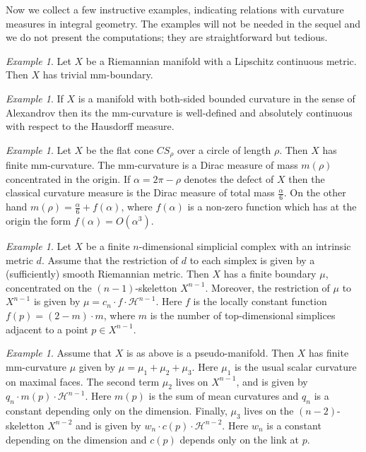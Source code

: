 \documentclass[12pt,leqno]{amsart}
\numberwithin{equation}{section}
\theoremstyle{definition}
\theoremstyle{remark}
\newtheorem{ex}[thm]{Example}
\begin{document}
Now we collect a few instructive examples, indicating relations with curvature measures in integral geometry.  The examples  will not be needed in the sequel and we do not present the computations;
they are straightforward but tedious.

\begin{ex}
Let $X$ be a Riemannian manifold with a Lipschitz continuous metric.
Then $X$ has  trivial mm-boundary.
\end{ex}


 \begin{ex}
  If $X$ is a manifold with  both-sided bounded curvature in the sense of Alexandrov then its
 the mm-curvature   is  well-defined and  absolutely continuous with respect to the Hausdorff measure.
 \end{ex}




\begin{ex}
 Let $X$ be the flat cone $CS_{\rho}$ over a circle of length $\rho$.
  Then $X$ has finite mm-curvature. The mm-curvature is a Dirac measure of mass $m(\rho)$ concentrated in the origin.
  If $\alpha =2\pi-\rho$ denotes the defect of $X$ then the classical curvature measure is the Dirac measure of total mass
  $\frac \alpha 6$.  On the other hand $m(\rho)= \frac \alpha 6 + f(\alpha)$, where
  $f(\alpha)$ is a non-zero function which has at the origin the form $f(\alpha)= O(\alpha ^3)$.
   \end{ex}




 \begin{ex}
 Let $X$ be a finite $n$-dimensional simplicial complex with an intrinsic metric $d$.
 Assume that the restriction of $d$ to each simplex is given by a (sufficiently) smooth Riemannian metric.
 Then $X$ has a finite boundary $\mu$, concentrated on  the $(n-1)$-skeletton $X^{n-1}$.  
 Moreover, the restriction of $\mu $ to
 $X^{n-1}$ is given by $\mu= c_n \cdot f \cdot \mathcal H ^{n-1}$.
 Here $f$ is the locally constant function $f(p)=(2-m)\cdot m$, where $m$ is the number of top-dimensional simplices
 adjacent to a point $p\in X^{n-1}$.
 \end{ex}


 \begin{ex}
 Assume that $X$ is as above  is a pseudo-manifold.
 Then $X$ has finite mm-curvature $\mu$ given by $\mu = \mu _1 + \mu _2 + \mu _3$.  Here $\mu_1$ is  the usual scalar
    curvature on maximal faces. The second term  $\mu _2$ lives on $ X^{n-1}$, and is given by
    $q_n \cdot m(p) \cdot \mathcal H^{n-1}$.
    Here $m(p)$ is the sum of mean curvatures and $q_n$ is a constant depending only on the dimension.
    Finally, $\mu_3$ lives on the $(n-2)$-skeletton  $X^{n-2}$ and is given by $w_n \cdot c(p) \cdot \mathcal H^{n-2}$.
     Here $w_n$ is a constant depending on the dimension and $c(p)$ depends only on the link at $p$.
 \end{ex}
\end{document}
